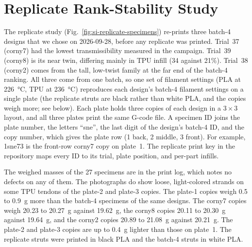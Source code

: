 \documentclass[11pt]{article}
\begin{document}
\section{Replicate Rank-Stability Study}
\label{si:rankstability}
The replicate study (Fig.~\ref{fig:si-replicate-specimens}) re-prints three batch-4 designs that we chose on
2026-09-28, before any replicate was printed. Trial~37 (corny7) had the
lowest transmissibility measured in the campaign. Trial~39 (corny8) is its
near twin, differing mainly in TPU infill (34 against 21\%). Trial~38
(corny2) comes from the tall, low-twist family at the far end of the
batch-4 ranking. All three come from one batch, so one set of filament
settings (PLA at \SI{226}{\celsius}, TPU at \SI{236}{\celsius})
reproduces each design's batch-4 filament settings on a single plate
(the replicate struts are black rather than white PLA, and the copies weigh
more; see below). Each
plate holds three copies of each design in a $3 \times 3$ layout, and all
three plates print the same G-code file. A specimen ID joins the plate
number, the letters ``sne'', the last digit of the design's batch-4 ID,
and the copy number, which gives the plate row (1 back, 2 middle,
3 front). For example, 1sne73 is the front-row corny7 copy on
plate~1. The replicate print key in the repository maps every ID to
its trial, plate position, and per-part infills.

The weighed masses of the 27 specimens are in the print log, which notes
no defects on any of them. The photographs do show loose, light-colored
strands on some TPU tendons of the plate-2 and plate-3 copies. The plate-1 copies weigh 0.5 to \SI{0.9}{g}
more than the batch-4 specimens of the same designs. The corny7 copies
weigh 20.23 to \SI{20.27}{g} against \SI{19.62}{g}, the corny8 copies
20.11 to \SI{20.30}{g} against \SI{19.64}{g}, and the corny2 copies
20.89 to \SI{21.08}{g} against \SI{20.21}{g}. The plate-2 and
plate-3 copies are up to \SI{0.4}{g} lighter than those on plate~1. The replicate struts were
printed in black PLA and the batch-4 struts in white PLA.
\end{document}
